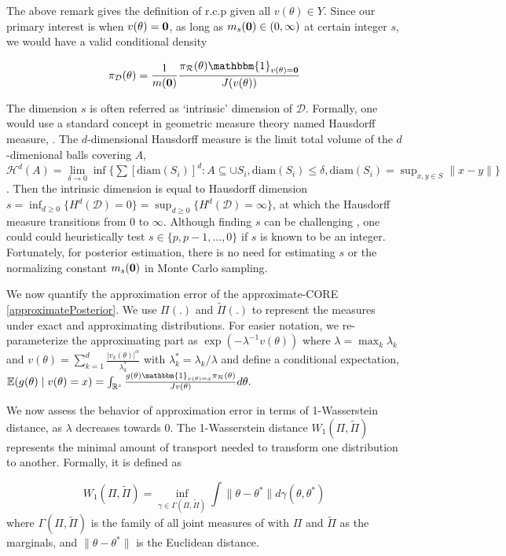 \documentclass[10pt,fleqn]{article}
\newcommand{\be}{\begin{equation}\begin{aligned}}
\newcommand{\ee}{\end{aligned}\end{equation}}
\newcommand{\bb}[1]{\mathbb{#1}}
\newcommand{\mc}[1]{\mathcal{#1}}
\DeclareMathOperator{\1}{\mathbbm{1}}
\begin{document}
The above remark gives the definition of r.c.p given all $v(\theta)\in Y$. Since our primary interest is when $v(\theta)=\bf 0$, as long as $m_s({\bf 0})\in (0,\infty)$ at certain integer $s$, we would have a valid conditional density 

\be 
\pi_{\mc D}(\theta)=
\frac{1}{m({\bf 0})}  \frac{\pi_{\mc
R}(\theta) \mathbbm{1}_{v({\theta})={\bf 0}}}{J(v(\theta))}
\ee 

The dimension $s$ is often referred as `intrinsic' dimension of $\mc D$. Formally, one would use a standard concept in geometric measure theory named Hausdorff measure,  \citep{federer2014geometric}. The $d$-dimensional Hausdorff measure is the limit total volume of the $d$-dimenional balls covering $A$, $\mc H^{d}(A)= \underset{\delta\rightarrow 0}\lim \inf \{ \sum \left[{\text{diam}(S_i)}\right]^d: {A\subseteq \cup S_i, \text{diam}(S_i)\le \delta}, \text{diam}(S_i)=\sup_{x,y\in S}\|x-y\|\}$. Then the intrinsic dimension is equal to Hausdorff dimension $s=\inf_{d\ge 0}\{H^d(\mc D)=0\}=\sup_{d\ge 0}\{H^d(\mc D)=\infty\}$, at which the Hausdorff measure transitions from $0$ to $\infty$. Although finding $s$ can be challenging \citep{mardia1975statistics,bowen1979hausdorff}, one could could heuristically test $s\in \{p,p-1,\ldots, 0\}$ if $s$ is known to be an integer. Fortunately, for posterior estimation, there is no need for estimating $s$ or the normalizing constant $m_s(\bf 0)$ in Monte Carlo sampling.

We now quantify the approximation error of the approximate-CORE \eqref{approximatePosterior}. 
We use $\Pi(.)$ and $\tilde\Pi(.)$ to represent the measures under exact and approximating distributions. 
 For easier notation, we re-parameterize the approximating part as $\exp(-\lambda^{-1}  v(\theta))$ where $\lambda=\max_k \lambda_k$ and $v(\theta)=\sum_{k=1}^d\frac{|v_k(\theta)|^{\alpha}}{\lambda^*_k}$ with $\lambda^*_k=\lambda_k/\lambda$ and define a conditional expectation, $\mathbb{E}(g(\theta) \mid v(\theta)=x)=  \int_{\bb R^s } \frac{ g(\theta) \mathbbm{1}_{v(\theta)=x} \pi_{\mc R}(\theta)}{ J v(\theta) } d \theta.$

 We now assess the behavior of approximation error in terms of 1-Wasserstein distance, as $\lambda$ decreases towards $0$. The 1-Wasserstein distance $W_1(\Pi,\tilde\Pi)$ represents the minimal amount of transport needed to transform one distribution to another. Formally, it is defined as

$$W_1(\Pi,\tilde\Pi)=\underset{\gamma\in \Gamma(\Pi,\tilde\Pi)}{\inf}\int \|\theta-\theta^*\| d\gamma(\theta,\theta^*)$$ 
where $\Gamma(\Pi,\tilde\Pi)$ is the family of all joint measures of with $\Pi$ and $\tilde\Pi$ as the marginals, and $\|\theta-\theta^*\|$ is the
Euclidean distance.
\end{document}
